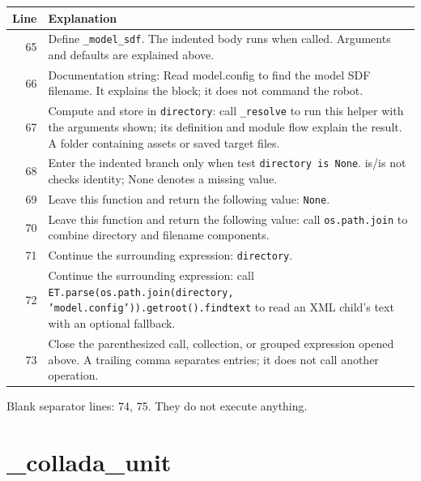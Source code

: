 \documentclass[11pt,a4paper]{book}
\begin{document}
\begin{longtable}{r p{}}

\textbf{Line} & \textbf{Explanation} \\ \hline \endhead

65 & Define \texttt{\_model\_sdf}. The indented body runs when called. Arguments and defaults are explained above. \\

66 & Documentation string: Read model.config to find the model SDF filename. It explains the block; it does not command the robot. \\

67 & Compute and store in \texttt{directory}: call \texttt{\_resolve} to run this helper with the arguments shown; its definition and module flow explain the result. A folder containing assets or saved target files. \\

68 & Enter the indented branch only when test \texttt{directory is None}. is/is not checks identity; None denotes a missing value. \\

69 & Leave this function and return the following value: \texttt{None}. \\

70 & Leave this function and return the following value: call \texttt{os.path.join} to combine directory and filename components. \\

71 & Continue the surrounding expression: \texttt{directory}. \\

72 & Continue the surrounding expression: call \texttt{ET.parse(os.path.join(directory, 'model.config')).getroot().findtext} to read an XML child's text with an optional fallback. \\

73 & Close the parenthesized call, collection, or grouped expression opened above. A trailing comma separates entries; it does not call another operation. \\

\end{longtable}

Blank separator lines: 74, 75. They do not execute anything.

\section{\_collada\_unit}
\end{document}
